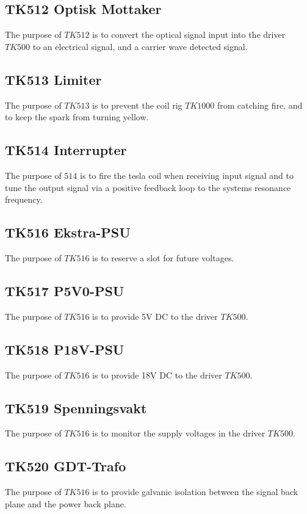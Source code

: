 \subsection*{TK512 Optisk Mottaker}
The purpose of $TK512$ is to convert the optical signal input into the driver $TK500$ to an electrical signal, and a carrier wave detected signal.

\subsection*{TK513 Limiter}
The purpose of $TK513$ is to prevent the coil rig $TK1000$ from catching fire, and to keep the spark from turning yellow.

\subsection*{TK514 Interrupter}
The purpose of $514$ is to fire the tesla coil when receiving input signal and to tune the output signal via a positive feedback loop to the systems resonance frequency.

\subsection*{TK516 Ekstra-PSU}
The purpose of $TK516$ is to reserve a slot for future voltages.

\subsection*{TK517 P5V0-PSU}
The purpose of $TK516$ is to provide 5V DC to the driver $TK500$.

\subsection*{TK518 P18V-PSU}
The purpose of $TK516$ is to provide 18V DC to the driver $TK500$.

\subsection*{TK519 Spenningsvakt}
The purpose of $TK516$ is to monitor the supply voltages in the driver $TK500$.

\subsection*{TK520 GDT-Trafo}
The purpose of $TK516$ is to provide galvanic isolation between the signal back plane and the power back plane.

